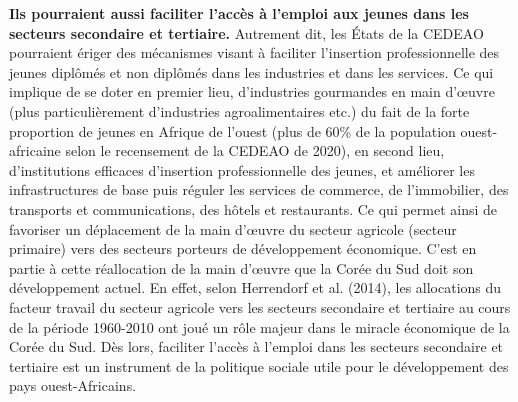 	 \hspace*{0.5cm}\textbf{Ils pourraient aussi faciliter l'accès à l'emploi aux jeunes dans les secteurs secondaire et tertiaire.} Autrement dit, les \'Etats de la CEDEAO pourraient ériger des mécanismes visant à faciliter l'insertion professionnelle des jeunes diplômés et non diplômés dans les industries et dans les services. Ce qui implique de se doter en premier lieu, d'industries gourmandes en main d'\oe uvre (plus particulièrement d'industries agroalimentaires etc.) du fait de la forte proportion de jeunes en Afrique de l'ouest (plus de 60\% de la population ouest-africaine selon le recensement de la CEDEAO de 2020), en second lieu, d'institutions efficaces d'insertion professionnelle des jeunes, et améliorer les infrastructures de base puis réguler les services de commerce, de l'immobilier, des transports et communications, des hôtels et restaurants. Ce qui permet ainsi de favoriser un déplacement de la main d'\oe uvre du secteur agricole (secteur primaire) vers des secteurs porteurs de développement économique. C'est en partie à cette réallocation de la main d'\oe uvre que la Corée du Sud doit son développement actuel. En effet, selon Herrendorf et al. (2014), les allocations du facteur travail du secteur agricole vers les secteurs secondaire et tertiaire au cours de la période 1960-2010 ont joué un rôle majeur dans le miracle économique de la Corée du Sud. Dès lors, faciliter l'accès à l'emploi dans les secteurs secondaire et tertiaire est un instrument de la politique sociale utile pour le développement des pays ouest-Africains.
	 
